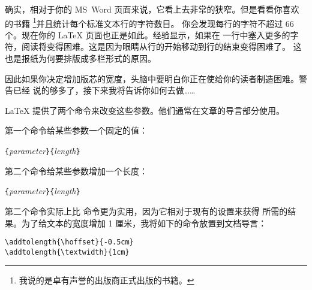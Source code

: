 确实，相对于你的 MS\ Word 页面来说，它看上去非常的狭窄。但是看看你喜欢的书籍
\footnote{我说的是卓有声誉的出版商正式出版的书籍。}并且统计每个标准文本行的字符数目。
你会发现每行的字符不超过 66 个。现在你的 \LaTeX{} 页面也正是如此。经验显示，如果在
一行中塞入更多的字符，阅读将变得困难。这是因为眼睛从行的开始移动到行的结束变得困难了。
这也是报纸为何要排版成多栏形式的原因。

因此如果你决定增加版芯的宽度，头脑中要明白你正在使给你的读者制造困难。警告已经
说的够多了，接下来我将告诉你如何去做……

\LaTeX{} 提供了两个命令来改变这些参数。他们通常在文章的导言部分使用。

第一个命令给某些参数一个固定的值：
\begin{lscommand}
\verb|{|\emph{parameter}\verb|}{|\emph{length}\verb|}|
\end{lscommand}


第二个命令给某些参数增加一个长度：
\begin{lscommand}
\verb|{|\emph{parameter}\verb|}{|\emph{length}\verb|}|
\end{lscommand}

第二个命令实际上比  命令更为实用，因为它相对于现有的设置来获得
所需的结果。为了给文本的宽度增加 1 厘米，我将如下的命令放置到文档导言：
\begin{code}
\verb|\addtolength{\hoffset}{-0.5cm}|\\
\verb|\addtolength{\textwidth}{1cm}|
\end{code}

